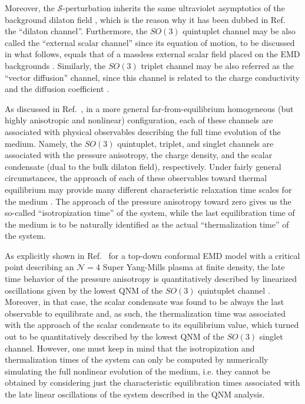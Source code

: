 \documentclass[aps,prd,showkeys,superscriptaddress,singlecolumn,nofootinbib,floatfix]{revtex4-1}
\begin{document}
Moreover, the $\mathcal{S}$-perturbation inherits the same ultraviolet asymptotics of the background dilaton field \cite{DeWolfe:2011ts,Janik:2016btb,Critelli:2017euk}, which is the reason why it has been dubbed in Ref.\ \cite{Critelli:2017euk} the ``dilaton channel''. Furthermore, the $SO(3)$ quintuplet channel may be also called the ``external scalar channel'' since its equation of motion, to be discussed in what follows, equals that of a massless external scalar field placed on the EMD backgrounds \cite{Rougemont:2015wca,DeWolfe:2011ts,Finazzo:2016psx}. Similarly, the $SO(3)$ triplet channel may be also referred as the ``vector diffusion'' channel, since this channel is related to the charge conductivity and the diffusion coefficient \cite{DeWolfe:2011ts,Rougemont:2015ona}.

As discussed in Ref.\ \cite{Critelli:2017euk}, in a more general far-from-equilibrium homogeneous (but highly anisotropic and nonlinear) configuration, each of these channels are associated with physical observables describing the full time evolution of the medium. Namely, the $SO(3)$ quintuplet, triplet, and singlet channels are associated with the pressure anisotropy, the charge density, and the scalar condensate (dual to the bulk dilaton field), respectively. Under fairly general circumstances, the approach of each of these observables toward thermal equilibrium may provide many different characteristic relaxation time scales for the medium \cite{Attems:2017zam}. The approach of the pressure anisotropy toward zero gives us the so-called ``isotropization time'' of the system, while the last equilibration time of the medium is to be naturally identified as the actual ``thermalization time'' of the system. 

As explicitly shown in Ref.\ \cite{Critelli:2017euk} for a top-down conformal EMD model with a critical point describing an $\mathcal{N}=4$ Super Yang-Mills plasma at finite density, the late time behavior of the pressure anisotropy is quantitatively described by linearized oscillations given by the lowest QNM of the $SO(3)$ quintuplet channel \cite{Finazzo:2016psx}. Moreover, in that case, the scalar condensate was found to be always the last observable to equilibrate and, as such, the thermalization time was associated with the approach of the scalar condensate to its equilibrium value, which turned out to be quantitatively described by the lowest QNM of the $SO(3)$ singlet channel. However, one must keep in mind that the isotropization and thermalization times of the system can only be computed by numerically simulating the full nonlinear evolution of the medium, i.e. they cannot be obtained by considering just the characteristic equilibration times associated with the late linear oscillations of the system described in the QNM analysis.
\end{document}
